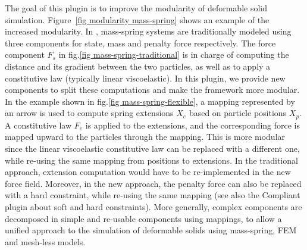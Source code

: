 The goal of this plugin is to improve the modularity of deformable solid simulation.
Figure~\ref{fig modularity mass-spring} shows an example of the increased modularity.
In \sofa{}, mass-spring systems are traditionally modeled using three components for  state, mass and penalty force respectively. 
The force component $F_s$ in fig.\ref{fig mass-spring-traditional} is in charge of computing the distance and its gradient between the two particles, as well as to apply a constitutive law (typically linear viscoelastic).
In this plugin, we provide new components to split these computations and make the framework more modular.
In the example shown in fig.\ref{fig mass-spring-flexible}, a mapping represented by an arrow is used to compute spring extensions $X_e$ based on particle positions $X_p$. 
A constitutive law $F_e$ is applied to the extensions, and the corresponding force is mapped upward to the particles through the mapping.
This is more modular since the linear viscoelastic constitutive law can be replaced with a different one, while re-using the same mapping from positions to extensions. In the traditional approach, extension computation would have to be re-implemented in the new force field.
Moreover, in the new approach, the penalty force can also be replaced with a hard constraint, while re-using the same mapping (see also the Compliant plugin about soft and hard constraints).
More generally, complex components are decomposed in simple and re-usable components using mappings, to allow a unified approach to the simulation of deformable solids using mass-spring, FEM and mesh-less models.
